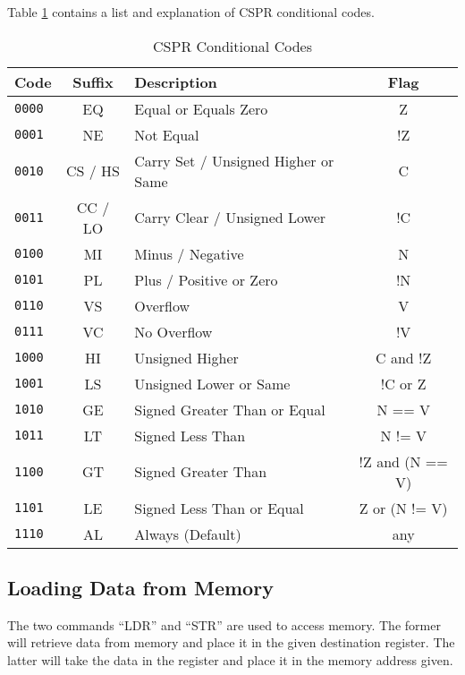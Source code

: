 				Table \ref{tab:CSPRConditionCodes} contains a list and explanation of CSPR conditional codes. 
				\begin{table}[htb]
					\centering
					\begin{tabular}{|l|c|l|c|}
						\hline
						\textbf{Code} & \textbf{Suffix} & \textbf{Description} & \textbf{Flag} \\ \hline
						\texttt{0000} & EQ & Equal or Equals Zero & Z \\ \hline
						\texttt{0001} & NE & Not Equal & !Z \\ \hline
						\texttt{0010} & CS / HS & Carry Set / Unsigned Higher or Same & C \\ \hline
						\texttt{0011} & CC / LO & Carry Clear / Unsigned Lower & !C \\ \hline
						\texttt{0100} & MI & Minus / Negative & N \\ \hline
						\texttt{0101} & PL & Plus / Positive or Zero & !N \\ \hline
						\texttt{0110} & VS & Overflow & V \\ \hline
						\texttt{0111} & VC & No Overflow & !V \\ \hline
						\texttt{1000} & HI & Unsigned Higher & C and !Z  \\ \hline
						\texttt{1001} & LS & Unsigned Lower or Same & !C or Z \\ \hline
						\texttt{1010} & GE & Signed Greater Than or Equal & N == V \\ \hline 
						\texttt{1011} & LT & Signed Less Than & N != V \\ \hline
						\texttt{1100} & GT & Signed Greater Than & !Z and (N == V) \\ \hline
						\texttt{1101} & LE & Signed Less Than or Equal & Z or (N != V) \\ \hline
						\texttt{1110} & AL & Always (Default) & any \\ \hline
					\end{tabular}
					\caption{CSPR Conditional Codes}
					\label{tab:CSPRConditionCodes}
				\end{table}


			\subsection{Loading Data from Memory}
				The two commands ``LDR'' and ``STR'' are used to access memory. 
				The former will retrieve data from memory and place it in the given destination register. 
				The latter will take the data in the register and place it in the memory address given. 

